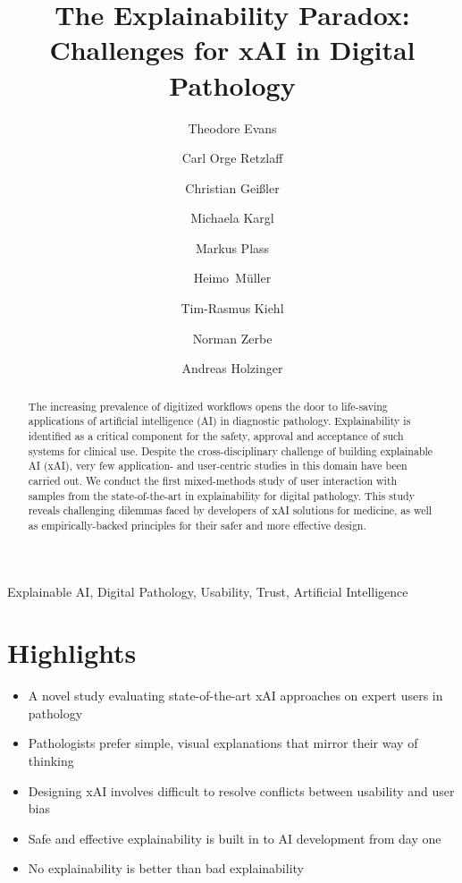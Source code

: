 \documentclass[final,5p,times,twocolumn,hyphens]{elsarticle}
\def\corref#1{}%
\begin{document}
\begin{frontmatter}

\title{The Explainability Paradox: Challenges for xAI in Digital Pathology}

\author[TUB]{Theodore Evans\corref{mycorrespondingauthor}}
\author[TUB]{Carl Orge Retzlaff}
\author[TUB]{Christian Geißler}
\author[MUG]{Michaela Kargl}
\author[MUG]{Markus Plass}
\author[MUG]{Heimo~M{\"u}ller}
\author[CAR]{Tim-Rasmus Kiehl}
\author[CAR]{Norman Zerbe}
\author[MUG]{Andreas Holzinger }

\address[TUB]{DAI-Labor, Technical University Berlin, Germany}
\address[MUG]{Medical University Graz, Austria}
\address[CAR]{Charité – Universit{\"a}tsmedizin Berlin, corporate member of Freie Universit{\"a}t Berlin and Humboldt- Universit{\"a}t zu Berlin, Institute of Pathology, Germany}

\begin{abstract} 
The increasing prevalence of digitized workflows opens the door to life-saving applications of artificial intelligence (AI) in diagnostic pathology. Explainability is identified as a critical component for the safety, approval and acceptance of such systems for clinical use. Despite the cross-disciplinary challenge of building explainable AI (xAI), very few application- and user-centric studies in this domain have been carried out. We conduct the first mixed-methods study of user interaction with samples from the state-of-the-art in explainability for digital pathology. This study reveals challenging dilemmas faced by developers of xAI solutions for medicine, as well as empirically-backed principles for their safer and more effective design.
\end{abstract}

\begin{keyword}
Explainable AI, Digital Pathology, Usability, Trust, Artificial Intelligence
\end{keyword}

\end{frontmatter}
\linenumbers

\section*{\textbf{Highlights}}

\begin{itemize}
    \item A novel study evaluating state-of-the-art xAI approaches on expert users in pathology
    \item Pathologists prefer simple, visual explanations that mirror their way of thinking
    \item Designing xAI involves difficult to resolve conflicts between usability and user bias
    \item Safe and effective explainability is built in to AI development from day one
    \item No explainability is better than bad explainability
\end{itemize}
\end{document}
